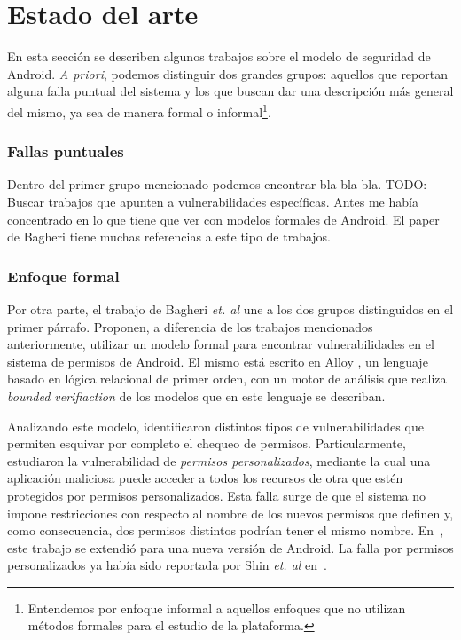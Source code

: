 
\chapter*{Estado del arte}
\label{chapter:estado}

En esta sección se describen algunos trabajos sobre el modelo de seguridad de
Android. \textit{A priori}, podemos distinguir dos grandes grupos: aquellos que
reportan alguna falla puntual del sistema y los que buscan dar una descripción
más general del mismo, ya sea de manera formal o informal\footnote{Entendemos
por enfoque informal a aquellos enfoques que no utilizan métodos formales para
el estudio de la plataforma.}.

\subsection*{Fallas puntuales}

Dentro del primer grupo mencionado podemos encontrar bla bla bla. TODO: Buscar
trabajos que apunten a vulnerabilidades específicas. Antes me había concentrado
en lo que tiene que ver con modelos formales de Android. El paper de Bagheri
\cite{bagheri} tiene muchas referencias a este tipo de trabajos.

\subsection*{Enfoque formal}

Por otra parte, el trabajo de Bagheri \textit{et. al} \cite{bagheri15} une a los
dos grupos distinguidos en el primer párrafo. Proponen, a diferencia de los trabajos
mencionados anteriormente, utilizar un modelo formal para encontrar
vulnerabilidades en el sistema de permisos de Android. El mismo está escrito en
Alloy \cite{alloy}, un lenguaje basado en lógica relacional de primer orden, con
un motor de análisis que realiza \textit{bounded verifiaction} de los
%
%
modelos que en este lenguaje se describan.

Analizando este modelo, identificaron distintos tipos de vulnerabilidades que
permiten esquivar por completo el chequeo de permisos. Particularmente,
estudiaron la vulnerabilidad
%
%
de \textit{permisos personalizados}, mediante la cual una aplicación maliciosa
puede acceder a todos los recursos de otra que estén protegidos por permisos
personalizados. Esta falla surge de que el sistema no impone restricciones con
respecto al nombre de los nuevos permisos que definen y, como consecuencia, dos
permisos distintos podrían tener el mismo nombre. En~\cite{bagheri}, este trabajo
se extendió para una nueva versión de Android. La falla por permisos personalizados
ya había sido reportada por Shin \textit{et. al} en~\cite{shin-custom}.

